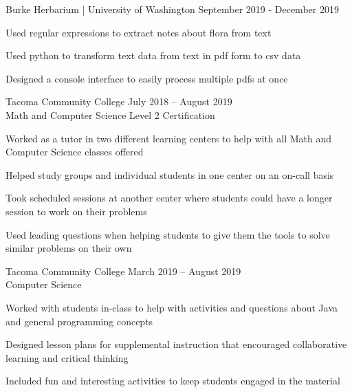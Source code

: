 \documentclass[10pt]{article}
\newenvironment{itemize*}
{\begin{itemize}[leftmargin=*]
    \setlength{\parskip}{0.5pt}}
{\end{itemize}}
\begin{document}
\begin{description}[leftmargin=!,
                    labelwidth=\widthof{\bfseries Lab Assistant}]
\item[Lab Assistant] Burke Herbarium | University of Washington \hfill
    September 2019 - December 2019\\
\end{description}
\begin{itemize*}
\item Used regular expressions to extract notes about flora from text
\item Used python to transform text data from text in pdf form to csv data
\item Designed a console interface to easily process multiple pdfs at once
\end{itemize*}
\vspace{10pt}


\begin{description}[leftmargin=!,
                    labelwidth=\widthof{\bfseries Internationally Certified Tutor}]

\item[Internationally Certified Tutor] Tacoma Community College \hfill
    July 2018 – August 2019\\
    Math and Computer Science \hfill Level 2 Certification
\end{description}

\begin{itemize*}
\item Worked as a tutor in two different learning centers to help
      with all Math and Computer Science classes offered
\item Helped study groups and individual students in one center on an on-call basis
\item Took scheduled sessions at another center where students could have a
      longer session to work on their problems
\item Used leading questions when helping students to give them the tools to
      solve similar problems on their own
\end{itemize*}
\vspace{10pt}

\begin{description}[leftmargin=!,
                    labelwidth=\widthof{\bfseries Supplementary Instruction Leader}]

\item[Supplementary Instruction Leader] Tacoma Community College \hfill
    March 2019 – August 2019\\
    Computer Science
\end{description}
\begin{itemize*}
\item Worked with students in-class to help with activities and questions about
      Java and general programming concepts
\item Designed lesson plans for supplemental instruction that
      encouraged collaborative learning and critical thinking
\item Included fun and interesting activities to keep students engaged in the material
\end{itemize*}
\end{document}
